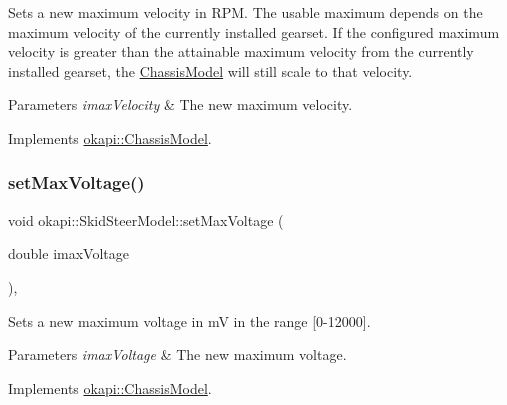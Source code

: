 Sets a new maximum velocity in R\+PM. The usable maximum depends on the maximum velocity of the currently installed gearset. If the configured maximum velocity is greater than the attainable maximum velocity from the currently installed gearset, the \mbox{\hyperlink{classokapi_1_1ChassisModel}{Chassis\+Model}} will still scale to that velocity.


\begin{DoxyParams}{Parameters}
{\em imax\+Velocity} & The new maximum velocity. \\
\hline
\end{DoxyParams}


Implements \mbox{\hyperlink{classokapi_1_1ChassisModel_ae7fcb4cc95fdd7fd3c8f8388b4a698b2}{okapi\+::\+Chassis\+Model}}.

\mbox{\label{classokapi_1_1SkidSteerModel_ad4dc0f8e3877b23ffb8ae58903bdffb7}} 
\subsubsection{\texorpdfstring{setMaxVoltage()}{setMaxVoltage()}}
{\footnotesize\ttfamily void okapi\+::\+Skid\+Steer\+Model\+::set\+Max\+Voltage (\begin{DoxyParamCaption}\item[{double}]{imax\+Voltage }\end{DoxyParamCaption})\hspace{0.3cm}{\ttfamily [override]}, {\ttfamily [virtual]}}

Sets a new maximum voltage in mV in the range {\ttfamily \mbox{[}0-\/12000\mbox{]}}.


\begin{DoxyParams}{Parameters}
{\em imax\+Voltage} & The new maximum voltage. \\
\hline
\end{DoxyParams}


Implements \mbox{\hyperlink{classokapi_1_1ChassisModel_a2fb261636b79e118f22530cc3fce4f41}{okapi\+::\+Chassis\+Model}}.

\mbox{\label{classokapi_1_1SkidSteerModel_a98d212cff8bad647ada6bcd3054c7581}} 
